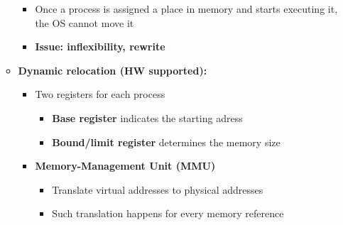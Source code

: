 \documentclass[a4paper,11pt,english]{article}
\begin{document}
\begin{itemize}
\begin{itemize}
\begin{itemize}
                    \item Once a process is assigned a place in memory and starts executing it, the OS cannot move it
                    \item \textbf{\color{red} Issue: inflexibility, rewrite}
                \end{itemize}
            \item \textbf{\color{blue} Dynamic relocation (HW supported):}
                \begin{itemize}
                    \item Two registers for each process
                        \begin{itemize}
                            \item \textbf{\color{blue} Base register} indicates the starting adress
                            \item \textbf{\color{blue} Bound/limit register} determines the memory size
                        \end{itemize}
                    \item \textbf{\color{blue} Memory-Management Unit (MMU)}
                        \begin{itemize}
                            \item Translate virtual addresses to physical addresses
                            \item Such translation happens for every memory reference
                        \end{itemize}
                \end{itemize}
        \end{itemize}
\end{itemize}
\end{document}
